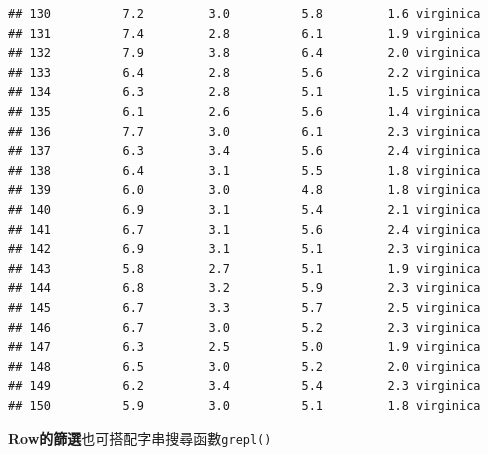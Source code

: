 \documentclass[]{book}
\newenvironment{Shaded}{\begin{snugshade}}{\end{snugshade}}
\newcommand{\KeywordTok}[1]{\textcolor[rgb]{0.13,0.29,0.53}{\textbf{{#1}}}}
\newcommand{\StringTok}[1]{\textcolor[rgb]{0.31,0.60,0.02}{{#1}}}
\newcommand{\NormalTok}[1]{{#1}}
\theoremstyle{definition}
\theoremstyle{definition}
\theoremstyle{remark}
\begin{document}
\begin{verbatim}
## 130          7.2         3.0          5.8         1.6 virginica
## 131          7.4         2.8          6.1         1.9 virginica
## 132          7.9         3.8          6.4         2.0 virginica
## 133          6.4         2.8          5.6         2.2 virginica
## 134          6.3         2.8          5.1         1.5 virginica
## 135          6.1         2.6          5.6         1.4 virginica
## 136          7.7         3.0          6.1         2.3 virginica
## 137          6.3         3.4          5.6         2.4 virginica
## 138          6.4         3.1          5.5         1.8 virginica
## 139          6.0         3.0          4.8         1.8 virginica
## 140          6.9         3.1          5.4         2.1 virginica
## 141          6.7         3.1          5.6         2.4 virginica
## 142          6.9         3.1          5.1         2.3 virginica
## 143          5.8         2.7          5.1         1.9 virginica
## 144          6.8         3.2          5.9         2.3 virginica
## 145          6.7         3.3          5.7         2.5 virginica
## 146          6.7         3.0          5.2         2.3 virginica
## 147          6.3         2.5          5.0         1.9 virginica
## 148          6.5         3.0          5.2         2.0 virginica
## 149          6.2         3.4          5.4         2.3 virginica
## 150          5.9         3.0          5.1         1.8 virginica
\end{verbatim}

\textbf{Row的篩選}也可搭配字串搜尋函數\texttt{grepl()}

\begin{Shaded}
\end{Shaded}
\end{document}
